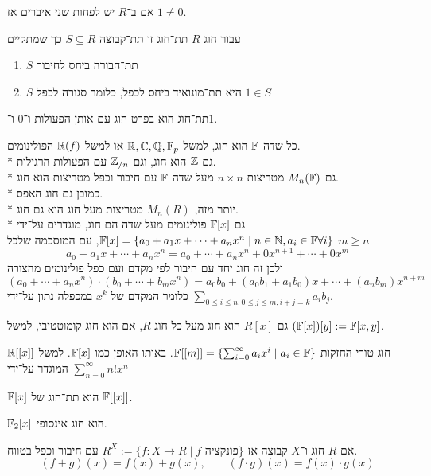 אם ב־$R$ יש לפחות שני איברים אז $1 \ne 0$.
\begin{definition}[תת־חוג]
	עבור חוג $R$ תת־חוג זו תת־קבוצה $S \subseteq R$ כך שמתקיים
	\begin{enumerate}
		\item $S$ תת־חבורה ביחס לחיבור
		\item $S$ היא תת־מונואיד ביחס לכפל, כלומר
			 סגורה לכפל
			 $1 \in S$
	\end{enumerate}
\end{definition}
\begin{remark}
	תת־חוג הוא בפרט חוג עם אותן הפעולות ו־$0$ ו־$1$.
\end{remark}
\begin{example}
	כל שדה $\mathbb{F}$ הוא חוג, למשל $\mathbb{R}, \mathbb{C}, \mathbb{Q}, \mathbb{F}_p$ או למשל $\mathbb{R}(f)$ הפולינומים. \\*
	גם $\mathbb{Z}$ הוא חוג, וגם $\mathbb{Z}_{/n}$ עם הפעולות הרגילות. \\*
	גם $M_n(\mathbb{F})$ מטריצות $n \times n$ מעל שדה $\mathbb{F}$ עם חיבור וכפל מטריצות הוא חוג. \\*
	כמובן גם חוג האפס. \\*
	יותר מזה, $M_n(R)$ מטריצות מעל חוג הוא גם חוג. \\*
	גם $\mathbb{F}[x]$ פולינומים מעל שדה הם חוג, מוגדרים על־ידי $\mathbb{F}[x] = \{ a_0 + a_1 x + \cdots + a_n x^n \mid n \in \mathbb{N}, a_i \in \mathbb{F} \forall i \}$, עם המוסכמה שלכל $m \ge n$
	\[
		a_0 + a_1 x + \cdots + a_n x^n = a_0 + \cdots + a_n x^n + 0 x^{n + 1} + \cdots + 0 x^m
	\]
	ולכן זה חוג יחד עם חיבור לפי מקדם ועם כפל פולינומים מהצורה
	\[
		(a_0 + \cdots + a_n x^n) \cdot (b_0 + \cdots + b_m x^n)
		= a_0 b_0 + (a_0 b_1 + a_1 b_0) x + \cdots + (a_n b_m) x^{n + m}
	\]
	כלומר המקדם של $x^k$ במכפלה נתון על־ידי $\sum_{0 \le i \le n, 0 \le j \le m, i + j = k} a_i b_j$.

	גם $R[x]$ הוא חוג מעל כל חוג $R$, אם הוא חוג קומוטטיבי, למשל $(\mathbb{F}[x])[y] := \mathbb{F}[x, y]$.
\end{example}
\begin{example}
	חוג טורי החזקות $\mathbb{F}[[m]] = \{ \sum_{i = 0}^\infty a_i x^i \mid a_i \in \mathbb{F} \}$.
	באותו האופן כמו $\mathbb{F}[x]$.
	למשל $\mathbb{R}[[x]]$ המוגדר על־ידי $\sum_{n = 0}^{\infty} n! x^n$
\end{example}
\begin{remark}
	$\mathbb{F}[x]$ הוא תת־חוג של $\mathbb{F}[[x]]$.
\end{remark}
\begin{remark}
	$\mathbb{F}_2[x]$ הוא חוג אינסופי.
\end{remark}
\begin{example}
	אם $R$ חוג ו־$X$ קבוצה אז $R^X := \{ f : X \to R \mid f \text{ פונקציה}\}$ עם חיבור וכפל בטווח.
	\[
		(f + g)(x) = f(x) + g(x),
		\qquad
		(f \cdot g)(x) = f(x) \cdot g(x)
	\]
\end{example}
